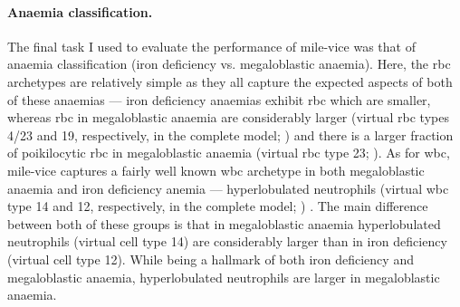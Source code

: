 \begin{figure}[!ht]
    \label{fig:rbc-mds-classification-examples}
\end{figure}

\begin{figure}[!ht]
    \label{fig:wbc-mds-classification-examples}
\end{figure}

\paragraph{Anaemia classification.} The final task I used to evaluate the performance of \ac{mile-vice} was that of anaemia classification (iron deficiency vs. megaloblastic anaemia). Here, the \ac{rbc} archetypes are relatively simple as they all capture the expected aspects of both of these anaemias --- iron deficiency anaemias exhibit \ac{rbc} which are smaller, whereas \ac{rbc} in megaloblastic anaemia are considerably larger (virtual \ac{rbc} types 4/23 and 19, respectively, in the complete model; ) and there is a larger fraction of poikilocytic \ac{rbc} in megaloblastic anaemia (virtual \ac{rbc} type 23; ). As for \ac{wbc}, \ac{mile-vice} captures a fairly well known \ac{wbc} archetype in both megaloblastic anaemia and iron deficiency anemia --- hyperlobulated neutrophils (virtual \ac{wbc} type 14 and 12, respectively, in the complete model; ) \cite{Lindenbaum1980-ux,Westerman1999-gs}. The main difference between both of these groups is that in megaloblastic anaemia hyperlobulated neutrophils (virtual cell type 14) are considerably larger than in iron deficiency (virtual cell type 12). While being a hallmark of both iron deficiency and megaloblastic anaemia, hyperlobulated neutrophils are larger in megaloblastic anaemia.

\begin{figure}[!ht]
    \label{fig:mile-vice-vcq-so-anaemia-classification}
\end{figure}

